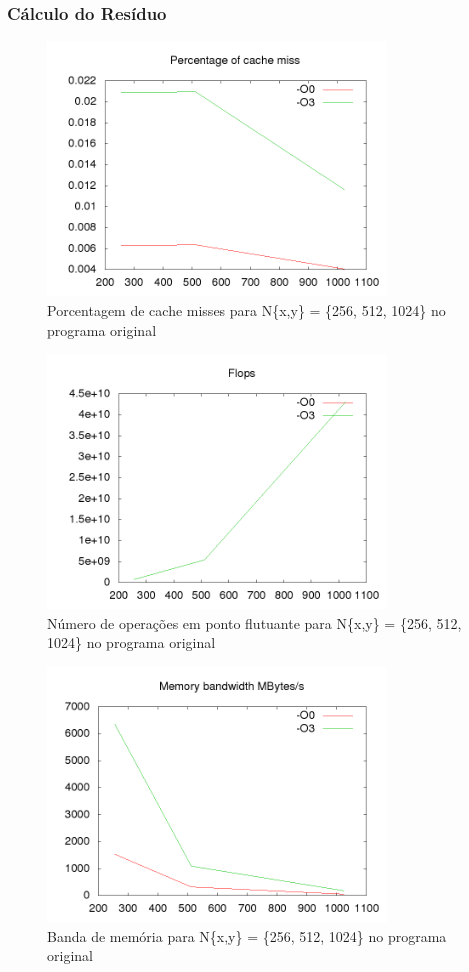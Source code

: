 \documentclass[12pt]{article}
\begin{document}
		\newpage
		\subsubsection{Cálculo do Resíduo}
		\begin{figure}[ht!]
			\centering
			\includegraphics[width=90mm]{old_res_cache.png}
			\caption{Porcentagem de cache misses para N\{x,y\} = \{256, 512, 1024\} no programa original}
		\end{figure}
		
		\begin{figure}[ht!]
			\centering
			\includegraphics[width=90mm]{old_res_flops.png}
			\caption{Número de operações em ponto flutuante para N\{x,y\} = \{256, 512, 1024\} no programa original}
		\end{figure}

		\newpage
		\begin{figure}[ht!]
			\centering
			\includegraphics[width=90mm]{old_res_mem.png}
			\caption{Banda de memória para N\{x,y\} = \{256, 512, 1024\} no programa original}
		\end{figure}
	\newpage
		
\end{document}
